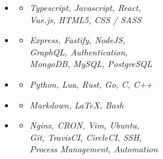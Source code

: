 \documentclass[11pt,oneside,a4paper,titlepage]{article}
\begin{document}
\begin{tcolorbox}
\begin{minipage}[t][25cm]{9cm}
\begin{tcolorbox}[grow to left by=0.55cm,colback=themeBorder,colframe=white,arc=0mm, height=26.275cm]
      \begin{itemize}[leftmargin=0.2cm, label={}]
        \item{
          {}
          \vspace{-0.2cm}
          \begin{itemize}[leftmargin=0.5cm, label={•}]
            \item{\emph{Typescript, Javascript, React,}\\
              \emph{Vue.js, HTML5, CSS / SASS}}
          \end{itemize}
        }
        \item{
          {}
          \vspace{-0.2cm}
          \begin{itemize}[leftmargin=0.5cm, label={•}]
            \item{\emph{Express, Fastify, NodeJS,}\\
            \emph{GraphQL, Authentication,}\\
          \emph{MongoDB, MySQL, PostgreSQL}}
          \end{itemize}
          }
        \item{
            {}
            \vspace{-0.2cm}
            \begin{itemize}[leftmargin=0.5cm, label={•}]
              \item{\emph{Python, Lua, Rust, Go, C, C++}}
            \end{itemize}
          }
        \item{
            {}
            \vspace{-0.2cm}
            \begin{itemize}[leftmargin=0.5cm, label={•}]
              \item{\emph{Markdown, LaTeX, Bash}}
            \end{itemize}
          }
        \item{
            {}
            \vspace{-0.2cm}
            \begin{itemize}[leftmargin=0.5cm, label={•}]
              \item{\emph{Nginx, CRON, Vim, Ubuntu,} \\
              \emph{Git, TravisCI, CircleCI, SSH,} \\
                \emph{Process Management, Automation}}
            \end{itemize}
          }
      \end{itemize}


\end{tcolorbox}
\end{minipage}
\end{tcolorbox}
\end{document}
